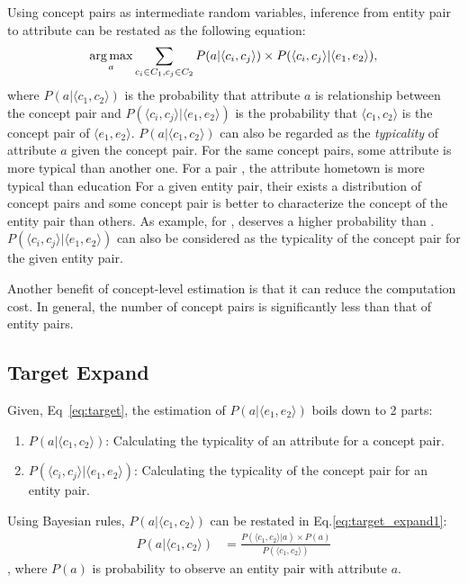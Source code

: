 Using concept pairs as intermediate random variables, inference from entity pair to attribute can be restated as the following equation:
\begin{equation}
\label{eq:target}
\operatorname*{arg\,max}_a \sum_{c_i\in C_1 , c_j \in C_2 }P(a|\langle c_{i},c_{j}\rangle)\times P(\langle c_{i},c_{j}\rangle|\langle e_{1},e_{2}\rangle),
\end{equation}
where $P(a|\langle c_{1},c_{2}\rangle)$ is the probability that attribute $a$ is relationship between the concept pair
and $P(\langle c_{i},c_{j}\rangle |\langle e_{1},e_{2}\rangle)$ is the probability that $\langle c_1, c_2\rangle$ is the concept pair of $ \langle e_1, e_2 \rangle $.
$P(a| \langle c_{1},c_{2} \rangle )$ can also be regarded as the {\it typicality} of attribute $a$ given the concept pair.
For the same concept pairs, some attribute is more typical than another one.
For a pair , the attribute \ac{hometown} is more typical than \ac{education}
For a given entity pair, their exists a distribution of concept pairs and some concept pair is better to characterize the concept of the entity pair than others.
As example,  for ,   deserves a higher probability than .
$P( \langle c_{i},c_{j} \rangle | \langle e_{1},e_{2} \rangle )$ can also be considered as the typicality of the concept pair for the given entity pair.


Another benefit of concept-level estimation is that it can reduce the computation cost.
In general, the number of concept pairs is significantly less than that of entity pairs.

\subsection{Target Expand}
Given, Eq~\ref{eq:target}, the estimation of $P(a| \langle e_1,e_2 \rangle )$ boils down to 2 parts:
\begin{enumerate}
\item $P(a| \langle c_{1},c_{2} \rangle )$: Calculating the typicality of an attribute for a concept pair.
\item $P( \langle c_{i},c_{j} \rangle | \langle e_{1},e_{2} \rangle )$: Calculating the typicality of the concept pair for an entity pair.
\end{enumerate}

Using Bayesian rules, $P(a| \langle c_{1},c_{2} \rangle )$ can be restated in Eq.\ref{eq:target_expand1}:
\begin{equation}
\label{eq:target_expand1}
\begin{split}
P(a|\langle c_{1},c_{2} \rangle) &= \frac{ P(\langle c_{1},c_{2}\rangle|a)\times P(a) }{ P(\langle c_{1},c_{2}\rangle) }
\end{split}
\end{equation},
where $P(a)$ is probability to observe an entity pair with attribute $a$.


